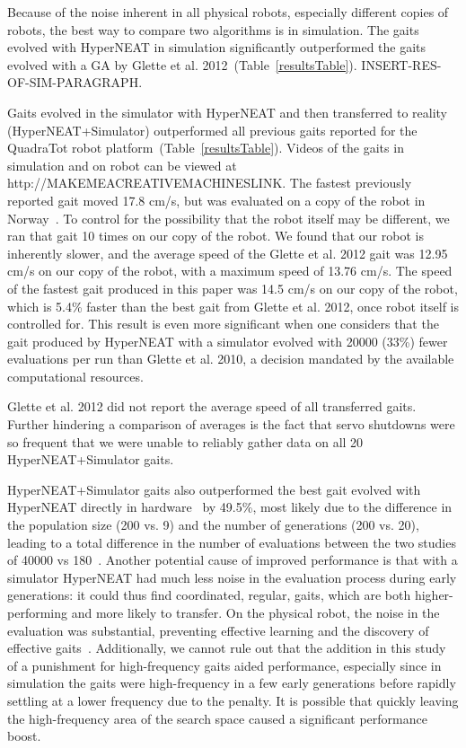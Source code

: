 Because of the noise inherent in all physical robots, especially different copies of robots, the best way to compare two algorithms is in simulation. The gaits evolved with HyperNEAT in simulation significantly outperformed the gaits evolved with a GA by Glette et al. 2012~(Table~\ref{resultsTable}). INSERT-RES-OF-SIM-PARAGRAPH. 

Gaits evolved in the simulator with HyperNEAT and then transferred to reality (HyperNEAT+Simulator) outperformed all previous gaits reported for the QuadraTot robot platform~(Table~\ref{resultsTable}). Videos of the gaits in simulation and on robot can be viewed at http://MAKEMEACREATIVEMACHINESLINK.
The fastest previously reported gait moved 17.8 cm/s, but was evaluated on a copy of the robot in Norway~\cite{glette}. To control for the possibility that the robot itself may be different, we ran that gait 10 times on our copy of the robot. We found that our robot is inherently slower, and the average speed of the Glette et al. 2012 gait was 12.95 cm/s on our copy of the robot, with a maximum speed of 13.76 cm/s.
The speed of the fastest gait produced in this paper was 14.5 cm/s on our copy of the robot, which is 5.4\% faster than the best gait from Glette et al. 2012, once robot itself is controlled for. This result is even more significant when one considers that the gait produced by HyperNEAT with a simulator evolved with 20000 (33\%) fewer evaluations per run than Glette et al. 2010, a decision mandated by the available computational resources.   

Glette et al. 2012 did not report the average speed of all transferred gaits. Further hindering a comparison of averages is the fact that servo shutdowns were so frequent that we were unable to reliably gather data on all 20 HyperNEAT+Simulator gaits. 


HyperNEAT+Simulator gaits also outperformed the best gait evolved with HyperNEAT directly in hardware~\cite{yos:clune} by 49.5\%, most likely due to the difference in the population size (200 vs. 9) and the number of generations (200 vs. 20), leading to a total difference in the number of evaluations between the two studies of 40000 vs 180~\cite{yos:clune}. Another potential cause of improved performance is that with a simulator HyperNEAT had much less noise in the evaluation process during early generations: it could thus find coordinated, regular, gaits, which are both higher-performing and more likely to transfer. On the physical robot, the noise in the evaluation was substantial, preventing effective learning and the discovery of effective gaits~\cite{yos:clune}. Additionally, we cannot rule out that the addition in this study of a punishment for high-frequency gaits aided performance, especially since in simulation the gaits were high-frequency in a few early generations before rapidly settling at a lower frequency due to the penalty. It is possible that quickly leaving the high-frequency area of the search space caused a significant performance boost. 

